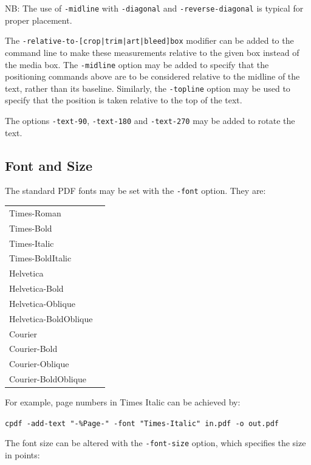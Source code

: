 \documentclass{book}
\begin{document}
NB: The use of \texttt{-midline} with \texttt{-diagonal} and \texttt{-reverse-diagonal} is typical for proper placement.

The \texttt{-relative-to-[crop|trim|art|bleed]box} modifier can be added to the command line to
make these measurements relative to the given box instead of the media box. The \texttt{-midline} option may be added to specify that the positioning
commands above are to be considered relative to the midline of the text, rather
than its baseline. Similarly, the \texttt{-topline} option may be used to specify that the position is taken relative to the top of the text.

The options \texttt{-text-90}, \texttt{-text-180} and \texttt{-text-270} may be added to rotate the text.

  \subsection{Font and Size}
\label{fonts}
  The standard PDF fonts may be set with the \texttt{-font} option. They are:

  \vspace{2mm}
  \begin{tabular}{ll}
    Times-Roman&\\
    Times-Bold&\\
    Times-Italic&\\
    Times-BoldItalic&\\
    Helvetica&\\
    Helvetica-Bold&\\
    Helvetica-Oblique&\\
    Helvetica-BoldOblique&\\
    Courier&\\
    Courier-Bold&\\
    Courier-Oblique&\\
Courier-BoldOblique
  \end{tabular}
 \vspace{2mm}

  \noindent For example, page numbers in Times Italic can be achieved by:

  \begin{framed}
    \noindent\small\verb!cpdf -add-text "-%Page-" -font "Times-Italic" in.pdf -o out.pdf!
  \end{framed}

\noindent The font size can be altered with the \texttt{-font-size} option, which
specifies the size in points:
\end{document}
